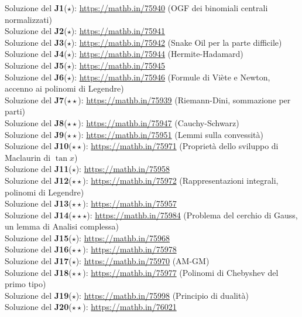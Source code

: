 \documentclass[a4paper,twoside]{article}
\theoremstyle{definition}
\numberwithin{theorem}{section}
\begin{document}
Soluzione del \textbf{J1}($\star$): \url{https://mathb.in/75940} (OGF dei binomiali centrali normalizzati)\\
Soluzione del \textbf{J2}($\star$): \url{https://mathb.in/75941} \\
Soluzione del \textbf{J3}($\star$): \url{https://mathb.in/75942} (Snake Oil per la parte difficile)\\
Soluzione del \textbf{J4}($\star$): \url{https://mathb.in/75944} (Hermite-Hadamard)\\
Soluzione del \textbf{J5}($\star$): \url{https://mathb.in/75945} \\
Soluzione del \textbf{J6}($\star$): \url{https://mathb.in/75946} (Formule di Viète e Newton, accenno ai polinomi di Legendre)\\
Soluzione del \textbf{J7}($\star\star$): \url{https://mathb.in/75939} (Riemann-Dini, sommazione per parti) \\
Soluzione del \textbf{J8}($\star\star$): \url{https://mathb.in/75947} (Cauchy-Schwarz)\\
Soluzione del \textbf{J9}($\star\star$): \url{https://mathb.in/75951} (Lemmi sulla convessità) \\
Soluzione del \textbf{J10}($\star\star$): \url{https://mathb.in/75971} (Proprietà dello sviluppo di Maclaurin di $\tan x$)\\
Soluzione del \textbf{J11}($\star$): \url{https://mathb.in/75958} \\
Soluzione del \textbf{J12}($\star\star$): \url{https://mathb.in/75972} (Rappresentazioni integrali, polinomi di Legendre)\\
Soluzione del \textbf{J13}($\star\star$): \url{https://mathb.in/75957} \\
Soluzione del \textbf{J14}($\star\star\star$): \url{https://mathb.in/75984} (Problema del cerchio di Gauss, un lemma di Analisi complessa)\\
Soluzione del \textbf{J15}($\star$): \url{https://mathb.in/75968} \\
Soluzione del \textbf{J16}($\star\star$): \url{https://mathb.in/75978} \\
Soluzione del \textbf{J17}($\star$): \url{https://mathb.in/75970} (AM-GM)\\
Soluzione del \textbf{J18}($\star\star$): \url{https://mathb.in/75977} (Polinomi di Chebyshev del primo tipo)\\
Soluzione del \textbf{J19}($\star$): \url{https://mathb.in/75998} (Principio di dualità) \\
Soluzione del \textbf{J20}($\star\star$): \url{https://mathb.in/76021} \\
\end{document}
